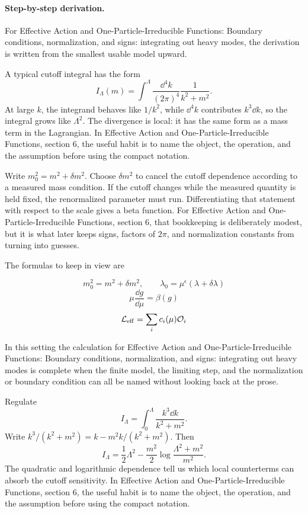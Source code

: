\paragraph{Step-by-step derivation.}

For Effective Action and One-Particle-Irreducible Functions: Boundary conditions, normalization, and signs: integrating out heavy modes, the derivation is written from the smallest usable model upward.

A typical cutoff integral has the form
\[
  I_\Lambda(m)=\int^{\Lambda}\frac{\dd^4k}{(2\pi)^4}\frac{1}{k^2+m^2}.
\]
At large \(k\), the integrand behaves like \(1/k^2\), while \(\dd^4k\) contributes \(k^3\dd k\), so the integral grows like \(\Lambda^2\).  The divergence is local: it has the same form as a mass term in the Lagrangian.  In Effective Action and One-Particle-Irreducible Functions, section 6, the useful habit is to name the object, the operation, and the assumption before using the compact notation.

Write \(m_0^2=m^2+\delta m^2\).  Choose \(\delta m^2\) to cancel the cutoff dependence according to a measured mass condition.  If the cutoff changes while the measured quantity is held fixed, the renormalized parameter must run.  Differentiating that statement with respect to the scale gives a beta function.  For Effective Action and One-Particle-Irreducible Functions, section 6, that bookkeeping is deliberately modest, but it is what later keeps signs, factors of \(2\pi\), and normalization constants from turning into guesses.

The formulas to keep in view are

\[
  m_0^2=m^2+\delta m^2,\qquad \lambda_0=\mu^\epsilon(\lambda+\delta\lambda)
\]
\[
  \mu\frac{\dd g}{\dd\mu}=\beta(g)
\]
\[
  \mathcal L_{\mathrm{eff}}=\sum_i c_i(\mu)\mathcal O_i
\]

In this setting the calculation for Effective Action and One-Particle-Irreducible Functions: Boundary conditions, normalization, and signs: integrating out heavy modes is complete when the finite model, the limiting step, and the normalization or boundary condition can all be named without looking back at the prose.




\begin{example}
Regulate
\[
  I_\Lambda=\int_0^\Lambda\frac{k^3\dd k}{k^2+m^2}.
\]
Write \(k^3/(k^2+m^2)=k-m^2k/(k^2+m^2)\).  Then
\[
  I_\Lambda=\frac12\Lambda^2-\frac{m^2}{2}\log\frac{\Lambda^2+m^2}{m^2}.
\]
The quadratic and logarithmic dependence tell us which local counterterms can absorb the cutoff sensitivity.  In Effective Action and One-Particle-Irreducible Functions, section 6, the useful habit is to name the object, the operation, and the assumption before using the compact notation.
\end{example}



